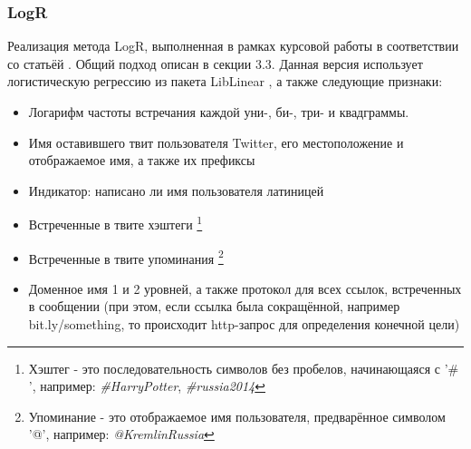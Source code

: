 \documentclass[a4paper, 14pt]{article}
\begin{document}
			\subsubsection{LogR}
			Реализация метода LogR, выполненная в рамках курсовой работы в соответствии со статьёй \cite{ppm}. Общий подход описан в секции 3.3. Данная версия использует логистическую регрессию из пакета LibLinear \cite{fan}, а также следующие признаки:
			\begin{itemize}
				\item Логарифм частоты встречания каждой уни-, би-, три- и квадграммы.
				\item Имя оставившего твит пользователя Twitter, его местоположение и отображаемое имя, а также их префиксы
				\item Индикатор: написано ли имя пользователя латиницей
				\item Встреченные в твите хэштеги
					\footnote{Хэштег - это последовательность символов без пробелов, начинающаяся с '$\#$', например: \textit{\#HarryPotter}, \textit{\#russia2014}}
				\item Встреченные в твите упоминания
					\footnote{Упоминание - это отображаемое имя пользователя, предварённое символом '@', например: \textit{@KremlinRussia}}
				\item Доменное имя 1 и 2 уровней, а также протокол для всех ссылок, встреченных в сообщении (при этом, если ссылка была сокращённой,
				например bit.ly/something, то происходит http-запрос для определения конечной цели)
			\end{itemize}
\end{document}
